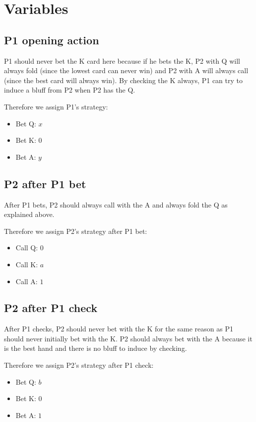 \documentclass[12pt]{article}
\begin{document}
\section{Variables}

\subsection{P1 opening action}
P1 should never bet the K card here because if he bets the K, P2 with Q will always fold (since the lowest card can never win) and P2 with A will always call (since the best card will always win). 
By checking the K always, P1 can try to induce a bluff from P2 when P2 has the Q. 

Therefore we assign P1's strategy:
\begin{itemize}
\item Bet Q: $x$
\item Bet K: $0$
\item Bet A: $y$
\end{itemize}

\subsection{P2 after P1 bet}
After P1 bets, P2 should always call with the A and always fold the Q as explained above. 

Therefore we assign P2's strategy after P1 bet:
\begin{itemize}
\item Call Q: $0$
\item Call K: $a$
\item Call A: $1$
\end{itemize}

\subsection{P2 after P1 check}
After P1 checks, P2 should never bet with the K for the same reason as P1 should never initially bet with the K. 
P2 should always bet with the A because it is the best hand and there is no bluff to induce by checking. 

Therefore we assign P2's strategy after P1 check:
\begin{itemize}
\item Bet Q: $b$
\item Bet K: $0$
\item Bet A: $1$
\end{itemize}
\end{document}
